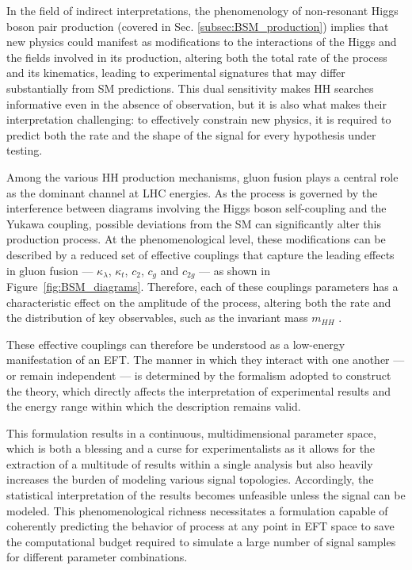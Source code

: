 In the field of indirect interpretations, the phenomenology of non-resonant Higgs boson pair production (covered in Sec. \ref{subsec:BSM_production}) implies that new physics could manifest as modifications to the interactions of the Higgs and the fields involved in its production, altering both the total rate of the process and its kinematics, leading to experimental signatures that may differ substantially from SM predictions. This dual sensitivity makes HH searches informative even in the absence of observation, but it is also what makes their interpretation challenging: to effectively constrain new physics, it is required to predict both the rate and the shape of the signal for every hypothesis under testing.

Among the various HH production mechanisms, gluon fusion plays a central role as the dominant channel at LHC energies. As the process is governed by the interference between diagrams involving the Higgs boson self-coupling and the Yukawa coupling, possible deviations from the SM can significantly alter this production process. At the phenomenological level, these modifications can be described by a reduced set of effective couplings that capture the leading effects in gluon fusion — $\kappa_{\lambda}$, $\kappa_t$, $c_2$, $c_g$ and $c_{2g}$ — as shown in Figure~\ref{fig:BSM_diagrams}. Therefore, each of these couplings parameters has a characteristic effect on the amplitude of the process, altering both the rate and the distribution of key observables, such as the invariant mass $m_{HH}$ .

These effective couplings can therefore be understood as a low-energy manifestation of an EFT. The manner in which they interact with one another — or remain independent — is determined by the formalism adopted to construct the theory, which directly affects the interpretation of experimental results and the energy range within which the description remains valid.

This formulation results in a continuous, multidimensional parameter space, which is both a blessing and a curse for experimentalists as it allows for the extraction of a multitude of results within a single analysis but also heavily increases the burden of modeling various signal topologies. Accordingly, the statistical interpretation of the results becomes unfeasible unless the signal can be modeled. This phenomenological richness necessitates a formulation capable of coherently predicting the behavior of process at any point in EFT space to save the computational budget required to simulate a large number of signal samples for different parameter combinations.

